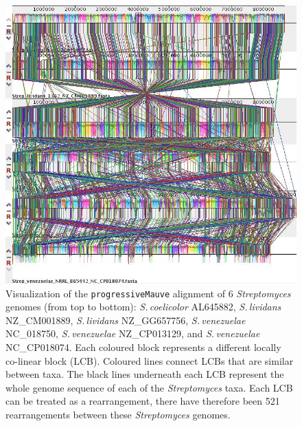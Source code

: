 \documentclass[11pt]{article}
\newcommand{\strep}{\textit{Streptomyces}\xspace}
\newcommand{\p}{\texttt{progressiveMauve}\xspace}
\newcommand{\sliv}{\textit{S.\,lividans}\xspace}
\newcommand{\sven}{\textit{S.\,venezuelae}\xspace}
\newcommand{\scoe}{\textit{S.\,coelicolor}\xspace}
\begin{document}
	\begin{figure}[H]
	\begin{center}
		\includegraphics[width=\textwidth]{./figs/6_strep_strains_mauve_aln_pic}
		\caption{\label{fig:strep6mauvealn} Visualization of the \p alignment of 6 \strep genomes (from top to bottom): \scoe AL645882, \sliv NZ\_CM001889, \sliv NZ\_GG657756, \sven NC\_018750, \sven NZ\_CP013129, and \sven NC\_CP018074. Each coloured block represents a different locally co-linear block (LCB). Coloured lines connect LCBs that are similar between taxa. The black lines underneath each LCB represent the whole genome sequence of each of the \strep taxa. Each LCB can be treated as a rearrangement, there have therefore been 521 rearrangements between these \strep genomes.}
	\end{center}
\end{figure}
\end{document}
